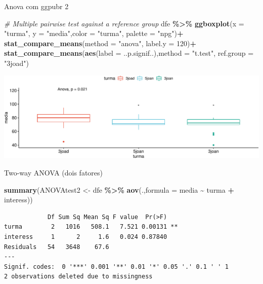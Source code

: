 \documentclass[
  9pt,
  ignorenonframetext,
  aspectratio=169]{beamer}
\newenvironment{Shaded}{\begin{snugshade}}{\end{snugshade}}
\newcommand{\CommentTok}[1]{\textcolor[rgb]{0.56,0.35,0.01}{\textit{#1}}}
\newcommand{\DataTypeTok}[1]{\textcolor[rgb]{0.13,0.29,0.53}{#1}}
\newcommand{\DecValTok}[1]{\textcolor[rgb]{0.00,0.00,0.81}{#1}}
\newcommand{\KeywordTok}[1]{\textcolor[rgb]{0.13,0.29,0.53}{\textbf{#1}}}
\newcommand{\NormalTok}[1]{#1}
\newcommand{\OperatorTok}[1]{\textcolor[rgb]{0.81,0.36,0.00}{\textbf{#1}}}
\newcommand{\StringTok}[1]{\textcolor[rgb]{0.31,0.60,0.02}{#1}}
\begin{document}
\begin{frame}[fragile]{Anova com ggpubr 2}
\protect\hypertarget{anova-com-ggpubr-2}{}
\begin{Shaded}
\begin{Highlighting}[]
\CommentTok{\# Multiple pairwise test against a reference group}
\NormalTok{dfe }\OperatorTok{\%\textgreater{}\%}\StringTok{ }
\StringTok{ }\KeywordTok{ggboxplot}\NormalTok{(}\DataTypeTok{x =} \StringTok{"turma"}\NormalTok{, }\DataTypeTok{y =} \StringTok{"media"}\NormalTok{,}\DataTypeTok{color =} \StringTok{"turma"}\NormalTok{, }\DataTypeTok{palette =} \StringTok{"npg"}\NormalTok{)}\OperatorTok{+}
\StringTok{ }\KeywordTok{stat\_compare\_means}\NormalTok{(}\DataTypeTok{method =} \StringTok{"anova"}\NormalTok{, }\DataTypeTok{label.y =} \DecValTok{120}\NormalTok{)}\OperatorTok{+}\StringTok{ }
\StringTok{ }\KeywordTok{stat\_compare\_means}\NormalTok{(}\KeywordTok{aes}\NormalTok{(}\DataTypeTok{label =}\NormalTok{ ..p.signif..),}\DataTypeTok{method =} \StringTok{"t.test"}\NormalTok{, }\DataTypeTok{ref.group =} \StringTok{"3joad"}\NormalTok{)}
\end{Highlighting}
\end{Shaded}

\includegraphics{aula_11_files/figure-beamer/unnamed-chunk-19-1.pdf}
\end{frame}

\begin{frame}[fragile]{Two-way ANOVA (dois fatores)}
\protect\hypertarget{two-way-anova-dois-fatores}{}
\begin{Shaded}
\begin{Highlighting}[]
\KeywordTok{summary}\NormalTok{(ANOVAtest2 \textless{}{-}}\StringTok{ }\NormalTok{dfe }\OperatorTok{\%\textgreater{}\%}\StringTok{ }\KeywordTok{aov}\NormalTok{(.,}\DataTypeTok{formula =}\NormalTok{ media }\OperatorTok{\textasciitilde{}}\StringTok{ }\NormalTok{turma }\OperatorTok{+}\StringTok{ }\NormalTok{interess))}
\end{Highlighting}
\end{Shaded}

\begin{verbatim}
            Df Sum Sq Mean Sq F value  Pr(>F)   
turma        2   1016   508.1   7.521 0.00131 **
interess     1      2     1.6   0.024 0.87840   
Residuals   54   3648    67.6                   
---
Signif. codes:  0 '***' 0.001 '**' 0.01 '*' 0.05 '.' 0.1 ' ' 1
2 observations deleted due to missingness
\end{verbatim}
\end{frame}
\end{document}
